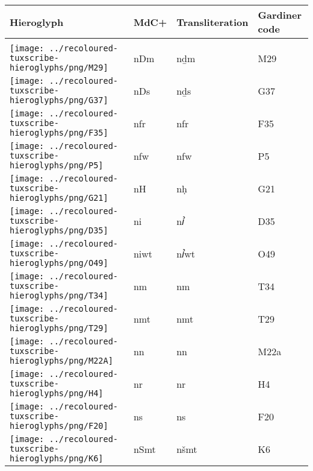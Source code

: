 \begin{center}
	\begin{tabularx}{\linewidth}{YYYY}
		Hieroglyph & MdC+ & Transliteration & Gardiner code\\
		\hline\\
		\texttt{[image: ../recoloured-tuxscribe-hieroglyphs/png/M29]} & nDm & nḏm & M29 \\ 
		\texttt{[image: ../recoloured-tuxscribe-hieroglyphs/png/G37]} & nDs & nḏs & G37 \\ 
		\texttt{[image: ../recoloured-tuxscribe-hieroglyphs/png/F35]} & nfr & nfr & F35 \\ 
		\texttt{[image: ../recoloured-tuxscribe-hieroglyphs/png/P5]} & nfw & nfw & P5 \\ 
		\texttt{[image: ../recoloured-tuxscribe-hieroglyphs/png/G21]} & nH & nḥ & G21 \\ 
		\texttt{[image: ../recoloured-tuxscribe-hieroglyphs/png/D35]} & ni & nꞽ & D35 \\ 
		\texttt{[image: ../recoloured-tuxscribe-hieroglyphs/png/O49]} & niwt & nꞽwt & O49 \\ 
		\texttt{[image: ../recoloured-tuxscribe-hieroglyphs/png/T34]} & nm & nm & T34 \\ 
		\texttt{[image: ../recoloured-tuxscribe-hieroglyphs/png/T29]} & nmt & nmt & T29 \\ 
		\texttt{[image: ../recoloured-tuxscribe-hieroglyphs/png/M22A]} & nn & nn & M22a \\ 
		\texttt{[image: ../recoloured-tuxscribe-hieroglyphs/png/H4]} & nr & nr & H4 \\ 
		\texttt{[image: ../recoloured-tuxscribe-hieroglyphs/png/F20]} & ns & ns & F20 \\ 
		\texttt{[image: ../recoloured-tuxscribe-hieroglyphs/png/K6]} & nSmt & nšmt & K6 \\ 
	\end{tabularx}
\end{center}


